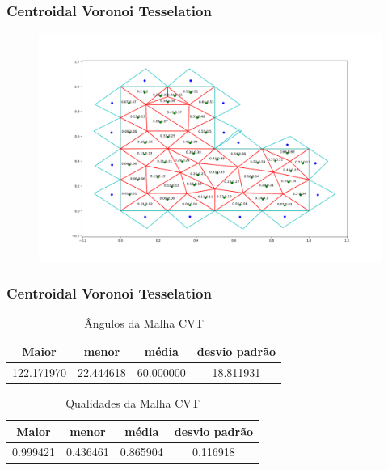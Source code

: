\documentclass{beamer}
\begin{document}
\begin{frame}
  \frametitle{Centroidal Voronoi Tesselation}

  \begin{figure}
    \includegraphics[width=0.6\linewidth]{malha-cvt.png}
  \end{figure}

\end{frame}
\begin{frame}
  \frametitle{Centroidal Voronoi Tesselation}

  \begin{table}[hb]
    \centering
    \par\caption{Ângulos da Malha CVT}
    \begin{tabular}{c|c|c|c}
      Maior      & menor     & média     & desvio padrão \\\hline\hline
      122.171970 & 22.444618 & 60.000000 & 18.811931     \\\hline
    \end{tabular}
    \label{tab:angulos-malha-cvt}
  \end{table}

  \begin{table}[hb]
    \centering
    \par\caption{Qualidades da Malha CVT}
    \begin{tabular}{c|c|c|c}
      Maior    & menor    & média    & desvio padrão \\\hline\hline
      0.999421 & 0.436461 & 0.865904 & 0.116918      \\\hline
    \end{tabular}
    \label{tab:qualidades-malha-cvt}
  \end{table}

\end{frame}
\end{document}
